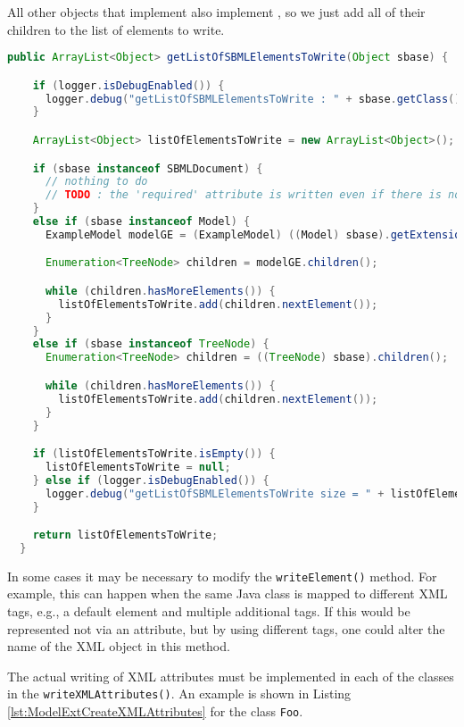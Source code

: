 All other objects that implement \SBase{} also implement \TreeNode, so we just add
all of their children to the list of elements to write.

\begin{lstlisting}[language=Java,caption={Extension parser: \texttt{getListOfSBMLElementsToWrite()}},label={lst:ModelExtParserListSBMLToWrite}]
  public ArrayList<Object> getListOfSBMLElementsToWrite(Object sbase) {

    if (logger.isDebugEnabled()) {
      logger.debug("getListOfSBMLElementsToWrite : " + sbase.getClass().getCanonicalName());
    }

    ArrayList<Object> listOfElementsToWrite = new ArrayList<Object>();

    if (sbase instanceof SBMLDocument) {
      // nothing to do
      // TODO : the 'required' attribute is written even if there is no plugin class for the SBMLDocument, so I am not totally sure how this is done.
    }
    else if (sbase instanceof Model) {
      ExampleModel modelGE = (ExampleModel) ((Model) sbase).getExtension(ExampleConstant.namespaceURI);

      Enumeration<TreeNode> children = modelGE.children();

      while (children.hasMoreElements()) {
        listOfElementsToWrite.add(children.nextElement());
      }
    }
    else if (sbase instanceof TreeNode) {
      Enumeration<TreeNode> children = ((TreeNode) sbase).children();

      while (children.hasMoreElements()) {
        listOfElementsToWrite.add(children.nextElement());
      }
    }

    if (listOfElementsToWrite.isEmpty()) {
      listOfElementsToWrite = null;
    } else if (logger.isDebugEnabled()) {
      logger.debug("getListOfSBMLElementsToWrite size = " + listOfElementsToWrite.size());
    }

    return listOfElementsToWrite;
  }
\end{lstlisting}

In some cases it may be necessary to modify the \texttt{writeElement()} method.
For example, this can happen when the same Java class is mapped to different XML tags, e.g., a default element and multiple additional tags.
If this would be represented not via an attribute, but by using different tags, one could alter the name of the XML object in this method.

The actual writing of XML attributes must be implemented in each of the classes in the \texttt{writeXMLAttributes()}.
An example is shown in Listing \ref{lst:ModelExtCreateXMLAttributes} for the class \texttt{Foo}.

